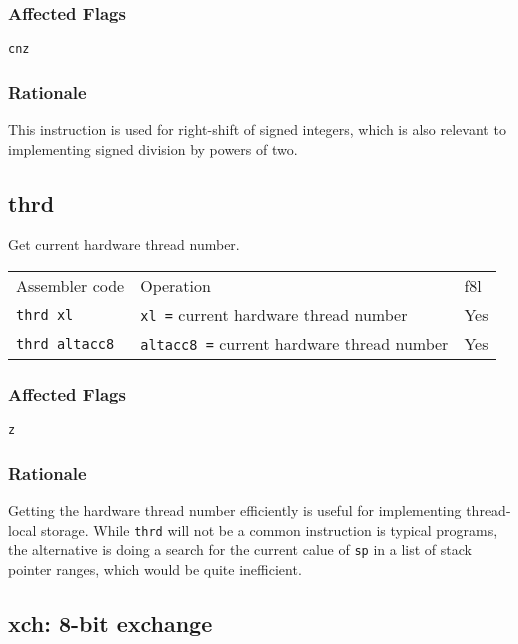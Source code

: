 \documentclass{book}
\begin{document}
\subsubsection*{Affected Flags}

\texttt{cnz}

\subsubsection*{Rationale}

This instruction is used for right-shift of signed integers, which is also relevant to implementing signed division by powers of two.

\subsection{thrd}

Get current hardware thread number.

\begin{tabular}{l l l}
Assembler code        & Operation                                         & f8l \\
\texttt{thrd xl}      & \texttt{xl =} current hardware thread number      & Yes \\
\texttt{thrd altacc8} & \texttt{altacc8 =} current hardware thread number & Yes \\
\end{tabular}

\subsubsection*{Affected Flags}

\texttt{z}

\subsubsection*{Rationale}

Getting the hardware thread number efficiently is useful for implementing thread-local storage. While \texttt{thrd} will not be a common instruction is typical programs, the alternative is doing a search for the current calue of \texttt{sp} in a list of stack pointer ranges, which would be quite inefficient.


\subsection{xch: 8-bit exchange}
\end{document}
